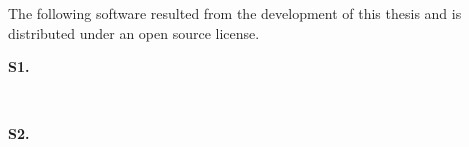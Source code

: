The following software resulted from the development of this thesis and is
distributed under an open source license.

\begin{description}
  \item[\textbf{S1.}]~~\cite{rodriguesnasf4niopy}

  \item[\textbf{S2.}]~~\cite{rodrigueshashcodemodels}
\end{description}
